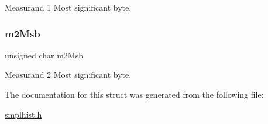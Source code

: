 Measurand 1 Most significant byte. \mbox{\label{structsensordatachars_a030c938f5a438a3556f1887dfe72466f}} 
\subsubsection{\texorpdfstring{m2\+Msb}{m2Msb}}
{\footnotesize\ttfamily unsigned char m2\+Msb}

Measurand 2 Most significant byte. 

The documentation for this struct was generated from the following file\+:\begin{DoxyCompactItemize}
\item 
\mbox{\hyperlink{smplhist_8h}{smplhist.\+h}}\end{DoxyCompactItemize}
